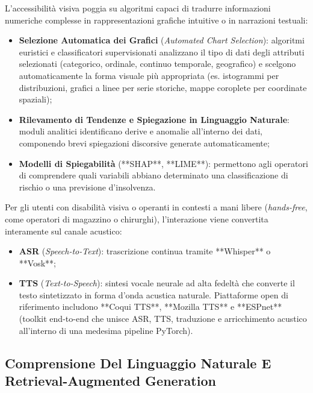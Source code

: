 \documentclass[11pt, a4paper]{article}
\begin{document}
L'accessibilità visiva poggia su algoritmi capaci di tradurre informazioni numeriche complesse in rappresentazioni grafiche intuitive o in narrazioni testuali:
\begin{itemize}
    \item \textbf{Selezione Automatica dei Grafici} (\emph{Automated Chart Selection}): algoritmi euristici e classificatori supervisionati analizzano il tipo di dati degli attributi selezionati (categorico, ordinale, continuo temporale, geografico) e scelgono automaticamente la forma visuale più appropriata (es. istogrammi per distribuzioni, grafici a linee per serie storiche, mappe coroplete per coordinate spaziali);
    \item \textbf{Rilevamento di Tendenze e Spiegazione in Linguaggio Naturale}: moduli analitici identificano derive e anomalie all'interno dei dati, componendo brevi spiegazioni discorsive generate automaticamente;
    \item \textbf{Modelli di Spiegabilità} (**SHAP**, **LIME**): permettono agli operatori di comprendere quali variabili abbiano determinato una classificazione di rischio o una previsione d'insolvenza.
\end{itemize}

Per gli utenti con disabilità visiva o operanti in contesti a mani libere (\emph{hands-free}, come operatori di magazzino o chirurghi), l'interazione viene convertita interamente sul canale acustico:
\begin{itemize}
    \item \textbf{ASR} (\emph{Speech-to-Text}): trascrizione continua tramite **Whisper** o **Vosk**;
    \item \textbf{TTS} (\emph{Text-to-Speech}): sintesi vocale neurale ad alta fedeltà che converte il testo sintetizzato in forma d'onda acustica naturale. Piattaforme open di riferimento includono **Coqui TTS**, **Mozilla TTS** e **ESPnet** (toolkit end-to-end che unisce ASR, TTS, traduzione e arricchimento acustico all'interno di una medesima pipeline PyTorch).
\end{itemize}


\subsection{Comprensione Del Linguaggio Naturale E Retrieval-Augmented Generation}
\end{document}
